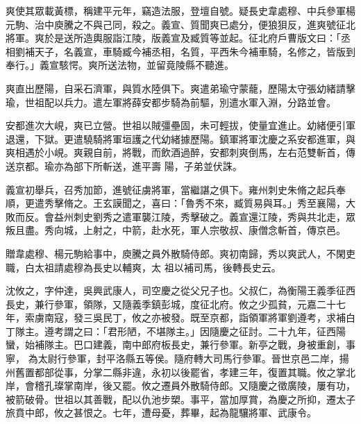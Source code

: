 \begin{pinyinscope}
 爽使其眾載黃標，稱建平元年，竊造法服，登壇自號。疑長史韋處穆、中兵參軍楊元駒、治中庾騰之不與己同，殺之。義宣、質聞爽已處分，便狼狽反，進爽號征北將軍。爽於是送所造輿服詣江陵，版義宣及臧質等並起。征北府戶曹版文曰：「丞相劉補天子，名義宣，車騎臧今補丞相，名質，平西朱今補車騎，名修之，皆版到奉行。」義宣駭愕。爽所送法物，並留竟陵縣不聽進。



 爽直出歷陽，自采石濟軍，與質水陸俱下。爽遣弟瑜守蒙蘢，歷陽太守張幼緒請擊瑜，世祖配以兵力。遣左軍將薛安都步騎為前驅，別遣水軍入淵，分路並會。



 安都進次大峴，爽已立營。世祖以賊彊壘固，未可輕拔，使量宜進止。幼緒便引軍退還，下獄。更遣驍騎將軍垣護之代幼緒據歷陽。鎮軍將軍沈慶之系安都進軍，與爽相遇於小峴。爽親自前，將戰，而飲酒過醉，安都刺爽倒馬，左右范雙斬首，傳送京都。瑜亦為部下所斬送，進平壽
 陽，子弟並伏誅。



 義宣初舉兵，召秀加節，進號征虜將軍，當繼諶之俱下。雍州刺史朱脩之起兵奉順，更遣秀擊脩之。王玄謨聞之，喜曰：「魯秀不來，臧質易與耳。」秀至襄陽，大敗而反。會益州刺史劉秀之遣軍襲江陵，秀擊破之。義宣還江陵，秀與共北走，眾叛且盡。秀向城，上射之，中箭，赴水死，軍人宗敬叔、康僧念斬首，傳京邑。



 贈韋處穆、楊元駒給事中，庾騰之員外散騎侍郎。爽初南歸，秀以爽武人，不閑吏職，白太祖請處穆為長史以輔爽，太
 祖以補司馬，後轉長史云。



 沈攸之，字仲達，吳興武康人，司空慶之從父兄子也。父叔仁，為衡陽王義季征西長史，兼行參軍，領隊，又隨義季鎮彭城，度征北府。攸之少孤貧，元嘉二十七年，索虜南寇，發三吳民丁，攸之亦被發。既至京都，詣領軍將軍劉遵考，求補白丁隊主。遵考謂之曰：「君形陋，不堪隊主。」因隨慶之征討。二十九年，征西陽蠻，始補隊主。巴口建義，南中郎府板長史，兼行參軍。新亭之戰，身被重創，事寧，
 為太尉行參軍，封平洛縣五等侯。隨府轉大司馬行參軍。晉世京邑二岸，揚州舊置都部從事，分掌二縣非違，永初以後罷省，孝建三年，復置其職。攸之掌北岸，會稽孔璨掌南岸，後又罷。攸之遷員外散騎侍郎。又隨慶之徵廣陵，屢有功，被箭破骨。世祖以其善戰，配以仇池步槊。事平，當加厚賞，為慶之所抑，遷太子旅賁中郎，攸之甚恨之。七年，遭母憂，葬畢，起為龍驤將軍、武康令。




\end{pinyinscope}
